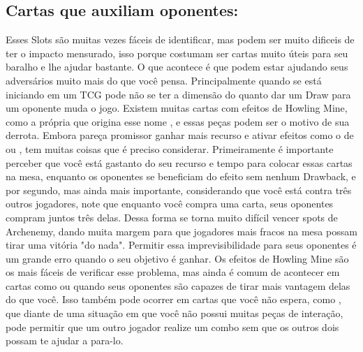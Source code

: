 \subsection{Cartas que auxiliam oponentes:}
Esses Slots são muitas vezes fáceis de identificar, mas podem ser muito dificeis de ter o impacto mensurado, isso porque costumam ser cartas muito úteis para seu baralho e lhe ajudar bastante.
O que acontece é que podem estar ajudando seus adversários muito mais do que você pensa. Principalmente quando se está iniciando em um TCG pode não se ter a dimensão do quanto dar um Draw para um oponente muda o jogo.
Existem muitas cartas com efeitos de Howling Mine, como a própria que origina esse nome , e essas peças podem ser o motivo de sua derrota. Embora pareça promissor ganhar mais recurso e ativar efeitos como o de  ou , tem muitas coisas que é preciso considerar.
Primeiramente é importante perceber que você está gastanto do seu recurso e tempo para colocar essas cartas na mesa, enquanto os oponentes se beneficiam do efeito sem nenhum Drawback, e por segundo, mas ainda mais importante, considerando que você está contra três outros jogadores, note que enquanto você compra uma carta, seus oponentes compram juntos três delas.
Dessa forma se torna muito difícil vencer spots de Archenemy, dando muita margem para que jogadores mais fracos na mesa possam tirar uma vitória "do nada". Permitir essa imprevisibilidade para seus oponentes é um grande erro quando o seu objetivo é ganhar.
Os efeitos de Howling Mine são os mais fáceis de verificar esse problema, mas ainda é comum de acontecer em cartas como  ou  quando seus oponentes são capazes de tirar mais vantagem delas do que você.
Isso também pode ocorrer em cartas que você não espera, como , que diante de uma situação em que você não possui muitas peças de interação, pode permitir que um outro jogador realize um combo sem que os outros dois possam te ajudar a para-lo.


